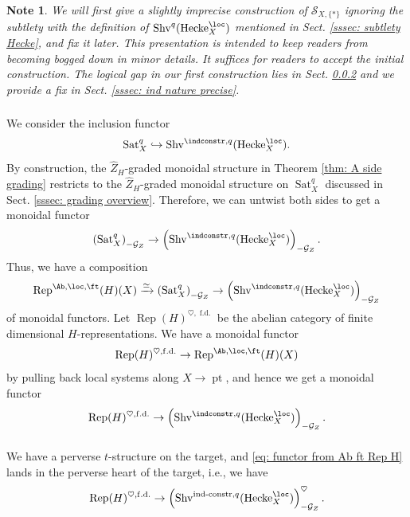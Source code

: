 \documentclass[10pt]{amsart}
\newcommand{\sssec}{\subsubsection}
\newtheorem{note}[subsubsection]{Note}
\theoremstyle{remark}
\newcommand{\wh}{\widehat}
\newcommand{\on}{\operatorname}
\newcommand{\cG}{\mathcal{G}}
\newcommand{\cS}{\mathcal{S}}
\newcommand{\Rep}{\on{Rep}}
\newcommand{\Shv}{\on{Shv}}
\newcommand{\Sat}{\on{Sat}}
\newcommand{\pt}{\on{pt}}
\newcommand{\Hecke}{\on{Hecke}}
\begin{document}
\begin{note}
We will first give a slightly imprecise construction of $\cS_{X,\{*\}}$ ignoring the subtlety with the definition of $\Shv^q(\Hecke^{\loc}_X)$ mentioned in Sect. \ref{sssec: subtlety Hecke}, and fix it later. This presentation is intended to keep readers from becoming bogged down in minor details. It suffices for readers to accept the initial construction. The logical gap in our first construction lies in Sect. \ref{sssec: problematic} and we provide a fix in Sect. \ref{sssec: ind nature precise}.    
\end{note}

\sssec{}
We consider the inclusion functor
\[\Sat^q_X\hookrightarrow \Shv^{\indconstr,q}(\Hecke^{\loc}_X).\]
By construction, the $\wh{Z}_H$-graded monoidal structure in Theorem \ref{thm: A side grading} restricts to the $\wh{Z}_H$-graded monoidal structure on $\Sat^q_X$ discussed in Sect. \ref{sssec: grading overview}. Therefore, we can untwist both sides to get a monoidal functor
\[\left(\Sat^q_X\right)_{-\cG_Z}\rightarrow \left(\Shv^{\indconstr,q}(\Hecke^{\loc}_X)\right)_{-\cG_Z}.\]
Thus, we have a composition
\[\Rep^{\Ab,\loc,\ft}(H)(X)\xrightarrow{\simeq} \left(\Sat^q_X\right)_{-\cG_Z}\rightarrow \left(\Shv^{\indconstr,q}(\Hecke^{\loc}_X)\right)_{-\cG_Z}\]
of monoidal functors. Let $\Rep(H)^{\heartsuit,\on{f.d.}}$ be the abelian category of finite dimensional $H$-representations. We have a monoidal functor
\[\Rep(H)^{\heartsuit,\on{f.d.}}\rightarrow \Rep^{\Ab,\loc,\ft}(H)(X)\]
by pulling back local systems along $X\rightarrow \pt$, and hence we get a monoidal functor
\begin{equation}\label{eq: functor from Ab ft Rep H}
    \Rep(H)^{\heartsuit,\on{f.d.}}\rightarrow \left(\Shv^{\indconstr,q}(\Hecke^{\loc}_X)\right)_{-\cG_Z}.
\end{equation}


\sssec{}\label{sssec: problematic}
We have a perverse $t$-structure on the target, and \eqref{eq: functor from Ab ft Rep H} lands in the perverse heart of the target, i.e., we have
\begin{equation}\label{eq: functor from Ab ft btw Abs}
    \Rep(H)^{\heartsuit,\on{f.d.}}\rightarrow \left(\Shv^{\on{ind-constr},q}(\Hecke^{\loc}_{X})\right)_{-\cG_Z}^{\heartsuit}.
\end{equation}
\end{document}
